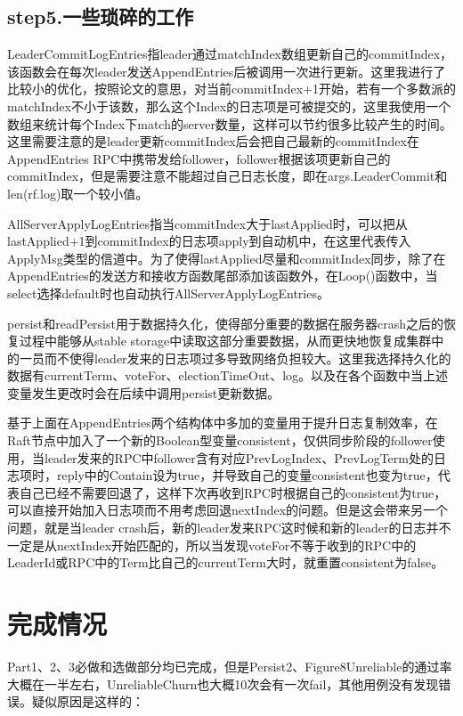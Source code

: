 \documentclass[UTF8]{article}
\begin{document}
\subsection{step5.一些琐碎的工作}

LeaderCommitLogEntries指leader通过matchIndex数组更新自己的commitIndex，该函数会在每次leader发送AppendEntries后被调用一次进行更新。这里我进行了比较小的优化，按照论文的意思，对当前commitIndex+1开始，若有一个多数派的matchIndex不小于该数，那么这个Index的日志项是可被提交的，这里我使用一个数组来统计每个Index下match的server数量，这样可以节约很多比较产生的时间。这里需要注意的是leader更新commitIndex后会把自己最新的commitIndex在AppendEntries RPC中携带发给follower，follower根据该项更新自己的commitIndex，但是需要注意不能超过自己日志长度，即在args.LeaderCommit和len(rf.log)取一个较小值。

AllServerApplyLogEntries指当commitIndex大于lastApplied时，可以把从lastApplied+1到commitIndex的日志项apply到自动机中，在这里代表传入ApplyMsg类型的信道中。为了使得lastApplied尽量和commitIndex同步，除了在AppendEntries的发送方和接收方函数尾部添加该函数外，在Loop()函数中，当select选择default时也自动执行AllServerApplyLogEntries。

persist和readPersist用于数据持久化，使得部分重要的数据在服务器crash之后的恢复过程中能够从stable storage中读取这部分重要数据，从而更快地恢复成集群中的一员而不使得leader发来的日志项过多导致网络负担较大。这里我选择持久化的数据有currentTerm、voteFor、electionTimeOut、log。以及在各个函数中当上述变量发生更改时会在后续中调用persist更新数据。

基于上面在AppendEntries两个结构体中多加的变量用于提升日志复制效率，在Raft节点中加入了一个新的Boolean型变量consistent，仅供同步阶段的follower使用，当leader发来的RPC中follower含有对应PrevLogIndex、PrevLogTerm处的日志项时，reply中的Contain设为true，并导致自己的变量consistent也变为true，代表自己已经不需要回退了，这样下次再收到RPC时根据自己的consistent为true，可以直接开始加入日志项而不用考虑回退nextIndex的问题。但是这会带来另一个问题，就是当leader crash后，新的leader发来RPC这时候和新的leader的日志并不一定是从nextIndex开始匹配的，所以当发现voteFor不等于收到的RPC中的LeaderId或RPC中的Term比自己的currentTerm大时，就重置consistent为false。

\section{完成情况}
Part1、2、3必做和选做部分均已完成，但是Persist2、Figure8Unreliable的通过率大概在一半左右，UnreliableChurn也大概10次会有一次fail，其他用例没有发现错误。疑似原因是这样的：
\end{document}
